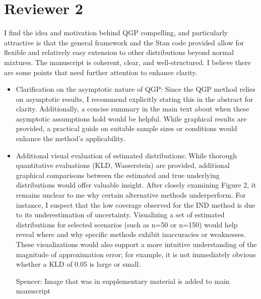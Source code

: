 \documentclass{article}
\newcommand{\spencer}[1]{{\color{blue} Spencer: #1}}
\begin{document}
  
\section*{Reviewer 2}


I find the idea and motivation behind QGP compelling, and particularly 
attractive is that the general framework and the Stan code provided allow for 
flexible and relatively easy extension to other distributions beyond normal 
mixtures. The manuscript is coherent, clear, and well-structured. I believe 
there are some points that need further attention to enhance clarity.

\begin{itemize}

\item Clarification on the asymptotic nature of QGP:
 Since the QGP method relies on asymptotic results, I recommend explicitly 
 stating this in the abstract for clarity. Additionally, a concise summary in 
 the main text about when these asymptotic assumptions hold would be helpful. 
 While graphical results are provided, a practical guide on suitable sample 
 sizes or conditions would enhance the method's applicability.

\item Additional visual evaluation of estimated distributions:
 While thorough quantitative evaluations (KLD, Wasserstein) are provided, 
 additional graphical comparisons between the estimated and true underlying 
 distributions would offer valuable insight. After closely examining Figure 2, 
 it remains unclear to me why certain alternative methods underperform. For 
 instance, I suspect that the low coverage observed for the IND method is due 
 to its underestimation of uncertainty. Visualizing a set of estimated 
 distributions for selected scenarios (such as n=50 or n=150) would help reveal 
 where and why specific methods exhibit inaccuracies or weaknesses. These 
 visualizations would also support a more intuitive understanding of the 
 magnitude of approximation error; for example, it is not immediately obvious 
 whether a KLD of 0.05 is large or small.
 
\spencer{Image that was in supplementary material is added to main manuscript}


\end{itemize}
\end{document}
